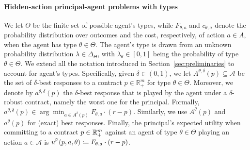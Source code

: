 \paragraph{Hidden-action principal-agent problems with types}
%
We let $\Theta$ be the finite set of possible agent's {types}, while $F_{\theta,a}$ and $c_{\theta,a}$ denote the probability distribution over outcomes and the cost, respectively, of action $a \in A$, when the agent has type $\theta \in \Theta$.
%
The agent's type is drawn from an unknown probability distribution $\lambda \in \Delta_\Theta$, with $\lambda_\theta \in [0,1]$ being the probability of type $\theta \in \Theta$.
%
We extend all the notation introduced in Section~\ref{sec:preliminaries} to account for agent's types.
%
Specifically, given $\delta \in (0,1)$, we let $A^{\theta,\delta}(p) \subseteq \mathcal{A}$ be the set of $\delta$-best responses to a contract $p \in \mathbb{R}_+^m$ for type $\theta \in \Theta$.
%
Moreover, we denote by $a^{\theta,\delta}(p)$ the $\delta$-best response that is played by the agent under a $\delta$-robust contract, namely the worst one for the principal.
%
Formally, $a^{\theta,\delta}(p) \in \arg\min_{a \in A^\delta (p)} F_{\theta,a} \cdot (r-p)$.
%
Similarly, we use $A^{\theta}(p)$ and $a^{\theta}(p)$ for (exact) best responses.
%
Finally, the principal's expected utility when committing to a contract $p \in \mathbb{R}^{m}_{+}$ against an agent of type $\theta \in \Theta$ playing an action $a \in \mathcal{A}$ is $u^{\mathsf{P}}(p,a,\theta) \coloneqq F_{\theta, a} \cdot (r - p)$.

